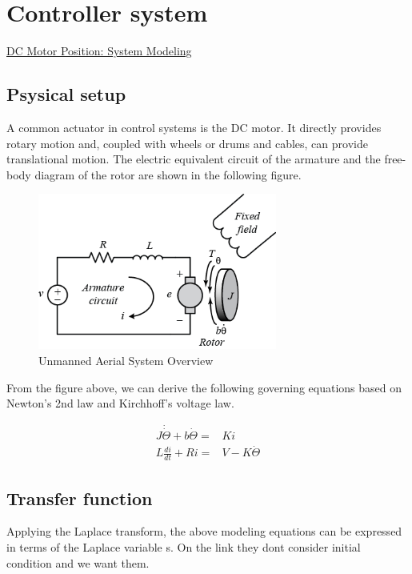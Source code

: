 \section*{Controller system}

\href{http://ctms.engin.umich.edu/CTMS/index.php?example=MotorPosition&section=SystemModeling}{DC Motor Position: System Modeling}

\subsection*{Psysical setup}
A common actuator in control systems is the DC motor. It directly provides rotary motion and, coupled with wheels or drums and cables, can provide translational motion. The electric equivalent circuit of the armature and the free-body diagram of the rotor are shown in the following figure. 
\begin{figure}[h!]\label{fig:motor_model}
	\centering
	\includegraphics[width=0.7\textwidth]{figures/motor.png}
	\caption{Unmanned Aerial System Overview}
\end{figure}

From the figure above, we can derive the following governing equations based on Newton's 2nd law and Kirchhoff's voltage law.

\begin{align}
J \dot{\dot{\Theta}} + b\dot{\Theta} =& Ki \\
L\frac{di}{dt} + Ri =& V - K\dot{\Theta}
\end{align}

\subsection*{Transfer function}
Applying the Laplace transform, the above modeling equations can be expressed in terms of the Laplace variable s. On the link they dont consider initial condition and we want them.


